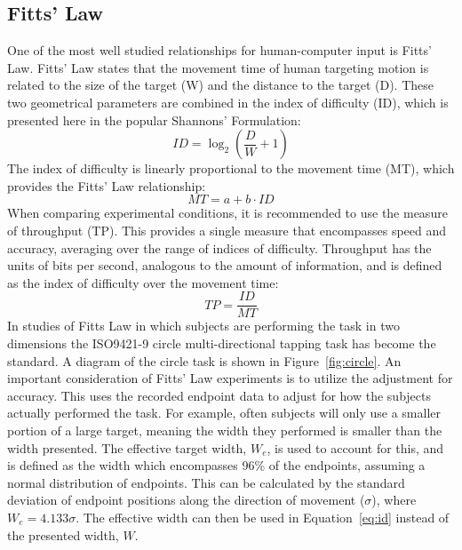 \documentclass[]{aiaa-tc}%
\begin{document}
\subsection{Fitts' Law}
One of the most well studied relationships for human-computer input is Fitts' Law\cite{fitts_information_1954}.
Fitts' Law states that the movement time of human targeting motion is related to the size of the target (W) and the distance to the target (D).
These two geometrical parameters are combined in the index of difficulty (ID), which is presented here in the popular Shannons' Formulation\cite{mackenzie_note_1989}:
\begin{equation}
  ID=\log_2\left(\frac{D}{W}+1\right)
  \label{eq:id}
\end{equation}
The index of difficulty is linearly proportional to the movement time (MT), which provides the Fitts' Law relationship:
\begin{equation}
  MT=a+b \cdot ID
\end{equation}
When comparing experimental conditions, it is recommended to use the measure of throughput (TP)\cite{soukoreff_towards_2004}.
This provides a single measure that encompasses speed and accuracy, averaging over the range of indices of difficulty.
Throughput has the units of bits per second, analogous to the amount of information, and is defined as the index of difficulty over the movement time:
\begin{equation}
  TP=\frac{ID}{MT}
  \label{eq:tp}
\end{equation}
In studies of Fitts Law in which subjects are performing the task in two dimensions the ISO9421-9 circle multi-directional tapping task has become the standard\cite{international_organization_for_standardization_iso_2000}.
A diagram of the circle task is shown in Figure~\ref{fig:circle}.
An important consideration of Fitts' Law experiments is to utilize the adjustment for accuracy.
This uses the recorded endpoint data to adjust for how the subjects actually performed the task.
For example, often subjects will only use a smaller portion of a large target, meaning the width they performed is smaller than the width presented.
The effective target width, $W_e$, is used to account for this, and is defined as the width which encompasses 96\% of the endpoints, assuming a normal distribution of endpoints.
This can be calculated by the standard deviation of endpoint positions along the direction of movement ($\sigma$), where $W_e = 4.133\sigma$.
The effective width can then be used in Equation~\ref{eq:id} instead of the presented width, $W$.
\end{document}
